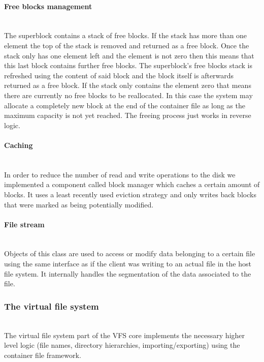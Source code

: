 \documentclass{scrartcl}
\begin{document}
\paragraph{Free blocks management} \ \\
The superblock contains a stack of free blocks.
If the stack has more than one element the top of the stack is removed and
returned as a free block.
Once the stack only has one element left and the element is not zero then this
means that this last block contains further free blocks. The superblock's free
blocks stack is refreshed using the content of said block and the block itself
is afterwards returned as a free block.
If the stack only contains the element zero that means there are currently no
free blocks to be reallocated. In this case the system may allocate a
completely new block at the end of the container file as long as the maximum
capacity is not yet reached.
The freeing process just works in reverse logic.

\paragraph{Caching} \ \\
In order to reduce the number of read and write operations to the disk we
implemented a component called block manager which caches a certain amount of
blocks. It uses a least recently used eviction strategy and only writes back
blocks that were marked as being potentially modified.

\paragraph{File stream} \ \\
Objects of this class are used to access or modify data belonging to a certain
file using the same interface as if the client was writing to an actual file in
the host file system. It internally handles the segmentation of the data
associated to the file.


\subsubsection{The virtual file system} \ \\
The virtual file system part of the VFS core implements the necessary higher
level logic (file names, directory hierarchies, importing/exporting) using the
container file framework.
\end{document}
